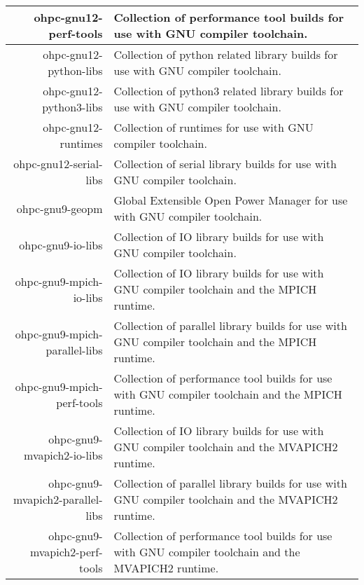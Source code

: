 \begin{tabularx}{\textwidth}{r|X}
\hline
ohpc-gnu12-perf-tools & Collection of performance tool builds for use with GNU compiler toolchain. \\ 
\hline
ohpc-gnu12-python-libs & Collection of python related library builds for use with GNU compiler toolchain. \\ 
\hline
ohpc-gnu12-python3-libs & Collection of python3 related library builds for use with GNU compiler toolchain. \\ 
\hline
ohpc-gnu12-runtimes & Collection of runtimes for use with GNU compiler toolchain. \\ 
\hline
ohpc-gnu12-serial-libs & Collection of serial library builds for use with GNU compiler toolchain. \\ 
\hline
ohpc-gnu9-geopm & Global Extensible Open Power Manager for use with GNU compiler toolchain. \\ 
\hline
ohpc-gnu9-io-libs & Collection of IO library builds for use with GNU compiler toolchain. \\ 
\hline
ohpc-gnu9-mpich-io-libs & Collection of IO library builds for use with GNU compiler toolchain and the MPICH runtime. \\ 
\hline
ohpc-gnu9-mpich-parallel-libs & Collection of parallel library builds for use with GNU compiler toolchain and the MPICH runtime. \\ 
\hline
ohpc-gnu9-mpich-perf-tools & Collection of performance tool builds for use with GNU compiler toolchain and the MPICH runtime. \\ 
\hline
ohpc-gnu9-mvapich2-io-libs & Collection of IO library builds for use with GNU compiler toolchain and the MVAPICH2 runtime. \\ 
\hline
ohpc-gnu9-mvapich2-parallel-libs & Collection of parallel library builds for use with GNU compiler toolchain and the MVAPICH2 runtime. \\ 
\hline
ohpc-gnu9-mvapich2-perf-tools & Collection of performance tool builds for use with GNU compiler toolchain and the MVAPICH2 runtime. \\ 
\hline
\bottomrule
\end{tabularx}
